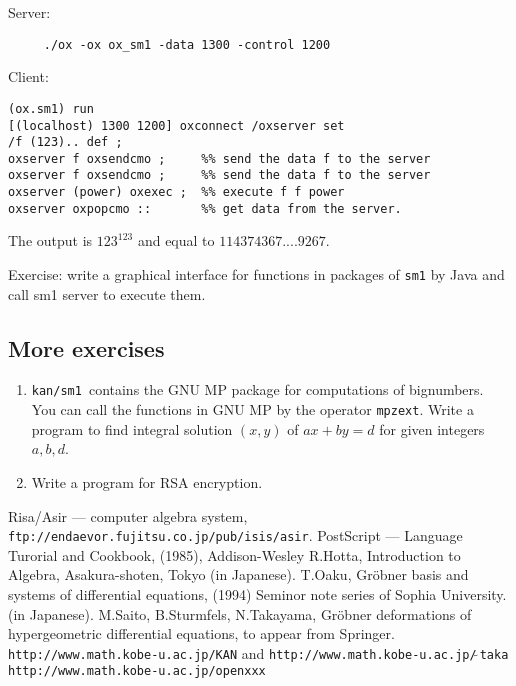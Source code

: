 \documentclass{article}
\def\kansm{ {\tt kan/sm1}\ }
\begin{document}
\noindent Server:
\begin{verbatim}
     ./ox -ox ox_sm1 -data 1300 -control 1200 
\end{verbatim}

\noindent Client:
\begin{verbatim}
(ox.sm1) run
[(localhost) 1300 1200] oxconnect /oxserver set
/f (123).. def ;
oxserver f oxsendcmo ;     %% send the data f to the server
oxserver f oxsendcmo ;     %% send the data f to the server
oxserver (power) oxexec ;  %% execute f f power
oxserver oxpopcmo ::       %% get data from the server.
\end{verbatim}
The output is $123^{123}$ and equal to
$114374367....9267$.


\noindent
Exercise:
write a graphical interface for functions in packages of {\tt sm1} by Java
and call sm1 server to execute them.

\subsection{More exercises}

\begin{enumerate}
\item \kansm contains the GNU MP package for computations of bignumbers.
You can call the functions in GNU MP by the operator {\tt mpzext}.
Write a program to find integral solution $(x,y)$ of
$ a x + b y = d$ for given integers $a, b, d$.
\item Write a program for RSA encryption.
\end{enumerate}

\begin{thebibliography}{99}
 Risa/Asir --- computer algebra system, \hfill\break
{\tt ftp://endaevor.fujitsu.co.jp/pub/isis/asir}.
 PostScript --- Language Turorial and Cookbook,
(1985), Addison-Wesley
 R.Hotta, Introduction to Algebra, Asakura-shoten, Tokyo
(in Japanese).
 T.Oaku, 
Gr\"obner basis and systems of differential equations,
(1994) Seminor note series of Sophia University.
(in Japanese).
M.Saito, B.Sturmfels, N.Takayama,
Gr\"obner deformations of hypergeometric differential equations,
to appear from Springer.
 {\tt http://www.math.kobe-u.ac.jp/KAN} and \hfill\break
{\tt http://www.math.kobe-u.ac.jp/$\tilde{\ }$taka}
{\tt http://www.math.kobe-u.ac.jp/openxxx}
\end{thebibliography}
\end{document}
